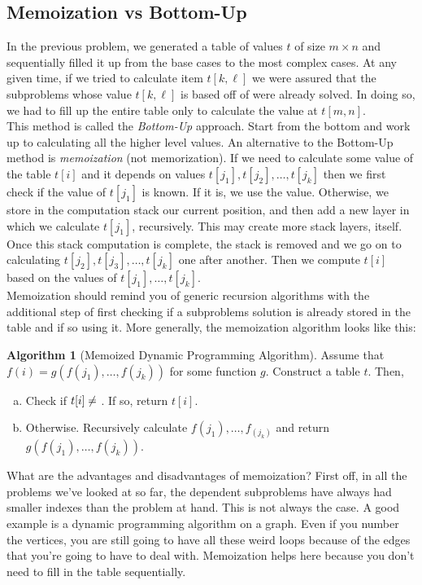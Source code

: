 \documentclass[10pt]{article}
\theoremstyle{plain}
\theoremstyle{definition}
\newtheorem{alg}[thm]{Algorithm}
\numberwithin{equation}{section}
\numberwithin{figure}{section}
\begin{document}
\subsection{Memoization vs Bottom-Up}
In the previous problem, we generated a table of values $t$ of size $m \times n$ and sequentially filled it up from the base cases to the most complex cases. At any given time, if we tried to calculate item $t[k, \ell]$ we were assured that the subproblems whose value $t[k,\ell]$ is based off of were already solved. In doing so, we had to fill up the entire table only to calculate the value at $t[m,n]$. \\

\noindent This method is called the \emph{Bottom-Up} approach. Start from the bottom and work up to calculating all the higher level values. An alternative to the Bottom-Up method is \emph{memoization} (not memorization). If we need to calculate some value of the table $t[i]$ and it depends on values $t[j_1], t[j_2], \ldots, t[j_k]$ then we first check if the value of $t[j_1]$ is known. If it is, we use the value. Otherwise, we store in the computation stack our current position, and then add a new layer in which we calculate $t[j_1]$, recursively. This may create more stack layers, itself. Once this stack computation is complete, the stack is removed and we go on to calculating $t[j_2], t[j_3], \ldots, t[j_k]$ one after another. Then we compute $t[i]$ based on the values of $t[j_1], \ldots, t[j_k]$. \\

\noindent Memoization should remind you of generic recursion algorithms with the additional step of first checking if a subproblems solution is already stored in the table and if so using it. More generally, the memoization algorithm looks like this:

\begin{alg}[Memoized Dynamic Programming Algorithm]
Assume that $f(i) = g( f(j_1), \ldots, f(j_k) )$ for some function $g$. Construct a table $t$. Then,
\begin{enumerate}[(a)]
\item Check if $t[i] \neq \null$. If so, return $t[i]$.
\item Otherwise. Recursively calculate $f(j_1), \ldots, f_(j_k)$ and return $g(f(j_1), \ldots, f(j_k))$. 
\end{enumerate}
\end{alg}

\noindent What are the advantages and disadvantages of memoization? First off, in all the problems we've looked at so far, the dependent subproblems have always had smaller indexes than the problem at hand. This is not always the case. A good example is a dynamic programming algorithm on a graph. Even if you number the vertices, you are still going to have all these weird loops because of the edges that you're going to have to deal with. Memoization helps here because you don't need to fill in the table sequentially. \\
\end{document}
